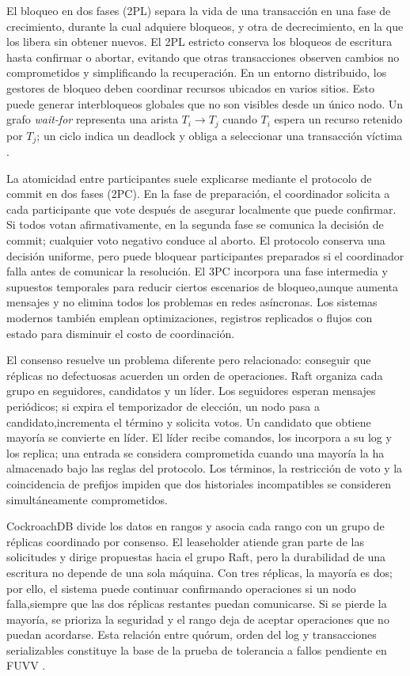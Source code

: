 \documentclass[12pt,a4paper]{article}
\begin{document}
El bloqueo en dos fases (2PL) separa la vida de una transacción en una fase de crecimiento, durante la cual adquiere bloqueos, y otra de decrecimiento, en la que los libera sin obtener nuevos. El 2PL estricto conserva los bloqueos de escritura hasta confirmar o abortar, evitando que otras transacciones observen cambios no comprometidos y simplificando la recuperación. En un entorno distribuido, los gestores de bloqueo deben coordinar recursos ubicados en varios sitios. Esto puede generar interbloqueos globales que no son visibles desde un único nodo. Un grafo \textit{wait-for} representa una arista $T_i\rightarrow T_j$ cuando $T_i$ espera un recurso retenido por $T_j$; un ciclo indica un deadlock y obliga a seleccionar una transacción víctima \cite{ozsu2020distributed,vansteen2023distributed}.

La atomicidad entre participantes suele explicarse mediante el protocolo de commit en dos fases (2PC). En la fase de preparación, el coordinador solicita a cada participante que vote después de asegurar localmente que puede confirmar. Si todos votan afirmativamente, en la segunda fase se comunica la decisión de commit; cualquier voto negativo conduce al aborto. El protocolo conserva una decisión uniforme, pero puede bloquear participantes preparados si el coordinador falla antes de comunicar la resolución. El 3PC incorpora una fase intermedia y supuestos temporales para reducir ciertos escenarios de bloqueo,aunque aumenta mensajes y no elimina todos los problemas en redes asíncronas. Los sistemas modernos también emplean optimizaciones, registros replicados o flujos con estado para disminuir el costo de coordinación\cite{gupta2020agreement,deheus2022transactions}.

El consenso resuelve un problema diferente pero relacionado: conseguir que réplicas no defectuosas acuerden un orden de operaciones. Raft organiza cada grupo en seguidores, candidatos y un líder. Los seguidores esperan mensajes periódicos; si expira el temporizador de elección, un nodo pasa a candidato,incrementa el término y solicita votos. Un candidato que obtiene mayoría se convierte en líder. El líder recibe comandos, los incorpora a su log y los replica; una entrada se considera comprometida cuando una mayoría la ha almacenado bajo las reglas del protocolo. Los términos, la restricción de voto y la coincidencia de prefijos impiden que dos historiales incompatibles se consideren simultáneamente comprometidos\cite{taft2020cockroachdb,lewchenko2025strongconsistency}.

CockroachDB divide los datos en rangos y asocia cada rango con un grupo de réplicas coordinado por consenso. El leaseholder atiende gran parte de las solicitudes y dirige propuestas hacia el grupo Raft, pero la durabilidad de una escritura no depende de una sola máquina. Con tres réplicas, la mayoría es dos; por ello, el sistema puede continuar confirmando operaciones si un nodo falla,siempre que las dos réplicas restantes puedan comunicarse. Si se pierde la mayoría, se prioriza la seguridad y el rango deja de aceptar operaciones que no puedan acordarse. Esta relación entre quórum, orden del log y transacciones serializables constituye la base de la prueba de tolerancia a fallos pendiente en FUVV \cite{taft2020cockroachdb,vanbenschoten2022multiregion}.
\end{document}
